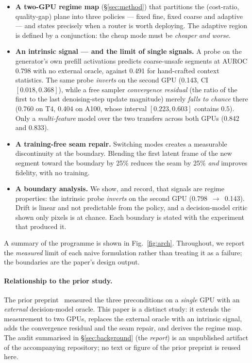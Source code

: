 \documentclass[review]{cas-sc}          %
\begin{document}
\begin{itemize}
  \item \textbf{A two-GPU regime map} (\S\ref{sec:method}) that partitions the
  (cost-ratio, quality-gap) plane into three policies --- fixed fine, fixed coarse and adaptive --- and
  states precisely when a router is worth deploying. The adaptive region is defined by a conjunction:
  the cheap mode must be \emph{cheaper} \emph{and} \emph{worse}.
  \item \textbf{An intrinsic signal --- and the limit of single signals.} A probe on the generator's own
  prefill activations predicts coarse-unsafe segments at AUROC 0.798 with no external oracle, against
  0.491 for hand-crafted context statistics. The same probe \emph{inverts} on the second GPU (0.143,
  CI $[0.018, 0.368]$), while a free sampler \emph{convergence residual} (the ratio of the first to the
  last denoising-step update magnitude) merely \emph{falls to chance} there (0.760 on T4, 0.404 on A100,
  whose interval $[0.223, 0.603]$ contains $0.5$). Only a \emph{multi-feature} model over the two
  transfers across both GPUs (0.842 and 0.833).
  \item \textbf{A training-free seam repair.} Switching modes creates a measurable discontinuity at the
  boundary. Blending the first latent frame of the new segment toward the boundary by 25\% reduces the
  seam by 25\% \emph{and} improves fidelity, with no training.
  \item \textbf{A boundary analysis.} We show, and record, that signals are regime properties: the
  intrinsic probe \emph{inverts} on the second GPU (0.798~$\rightarrow$~0.143). Drift is linear and not
  predictable from the policy, and a decision-model critic shown only pixels is at chance. Each boundary
  is stated with the experiment that produced it.
\end{itemize}

A summary of the programme is shown in Fig.~\ref{fig:arch}. Throughout, we report the \emph{measured}
limit of each naive formulation rather than treating it as a failure; the boundaries are the paper's
design output.

\paragraph{Relationship to the prior study.}
The prior preprint~\citep{hossen2026jevRouted} measured the three preconditions on a \emph{single} GPU
with an \emph{external} decision-model oracle. This paper is a distinct study: it extends the measurement
to two GPUs, replaces the external oracle with an intrinsic signal, adds the convergence residual and the
seam repair, and derives the regime map. The audit summarised in \S\ref{sec:background} (the
\emph{report}) is an unpublished artifact of the accompanying repository; no text or figure of the prior
preprint is reused here.
\end{document}
